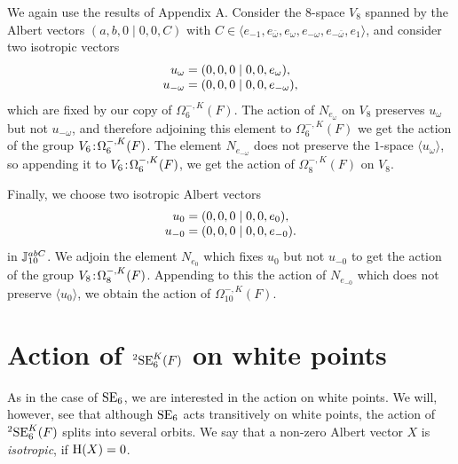 We again use the results of Appendix A. Consider the $8$-space $V_8$ spanned by the Albert vectors $(a,b,0\mid 0,0,C)$ with 
$C \in \langle e_{-1}, e_{\bar{\omega}}, e_{\omega}, 
e_{- \omega}, e_{-\bar{\omega}}, e_1 \rangle$, and consider two isotropic vectors
\begin{equation}
	\begin{array}{r@{\;}c@{\;}l}
		u_{\omega} & = & (0,0,0 \mid 0,0,e_{\omega}), \\
		u_{-\omega} & = & (0,0,0 \mid 0,0,e_{-\omega}),
	\end{array}
\end{equation}
which are fixed by our copy of $\Omega_6^{-,K}(F)$. The action of $N_{e_{\omega}}$ on $V_8$
preserves $u_{\omega}$ but not $u_{-\omega}$, and therefore adjoining this element to 
$\Omega_6^{-,K}(F)$ we get the action of the group $V_6\mathord{{\;\!{:}\;\!}}\Omega_6^{-,K}(F)$. The element
$N_{e_{-\omega}}$ does not preserve the $1$-space $\langle u_{\omega} \rangle$, so appending it to 
$V_6\mathord{{\;\!{:}\;\!}}\Omega_6^{-,K}(F)$, we get the action of $\Omega_8^{-,K}(F)$ on $V_8$. 

Finally, we choose two isotropic Albert vectors
\begin{equation}
	\begin{array}{r@{\;}c@{\;}l}
		u_0 & = & (0,0,0\mid 0,0,e_0), \\
		u_{-0} & = & (0,0,0\mid 0,0,e_{-0}).
	\end{array}
\end{equation}
in $\mathbb{J}_{10}^{abC}$. We adjoin the element $N_{e_{0}}$ which fixes $u_0$ but not $u_{-0}$ to 
get the action of the group $V_8\mathord{{\;\!{:}\;\!}} \Omega_8^{-,K}(F)$. Appending to this the action of
$N_{e_{-0}}$ which does not preserve $\langle u_0 \rangle$, we obtain the action of
$\Omega_{10}^{-,K}(F)$.

\section{Action of ${}^2\mathrm{SE}_6^K(F)$ on white points}

As in the case of $\mathrm{SE}_6$, we are interested in the action on white points. We will, however, see 
that although $\mathrm{SE}_6$ acts transitively on white points, the action of ${}^2\mathrm{SE}_6^K(F)$ splits
into several orbits. We say that a non-zero Albert vector $X$ is \textit{isotropic}, if
$\mathrm{H}(X) = 0$. 

